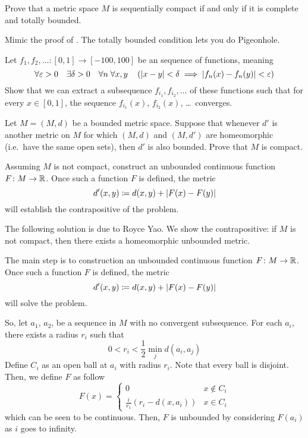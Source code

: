 \begin{dproblem}
	\gim
	Prove that a metric space $M$ is sequentially compact
	if and only if it is complete and totally bounded.
	\label{thm:bzw}
	\begin{hint}
		Mimic the proof of .
		The totally bounded condition lets you do Pigeonhole.
	\end{hint}
\end{dproblem}

\begin{problem}
	\gim
	Let
	$f_1, f_2, \ldots \colon [0,1] \to [-100,100]$
	be an  sequence of functions, meaning
	\[
		\forall \varepsilon > 0 \quad
		\exists \delta > 0 \quad
		\forall n \;
		\forall x,y \quad
		\left( \left\lvert x-y \right\rvert <\delta
		\implies \left\lvert f_n(x) - f_n(y) \right\rvert < \varepsilon \right)
	\]
	Show that we can extract a subsequence $f_{i_1}, f_{i_2}, \dots$
	of these functions such that for every $x \in [0,1]$,
	the sequence $f_{i_1}(x)$, $f_{i_2}(x)$, \dots\ converges.
\end{problem}

\begin{problem}
	\gim
	Let $M = (M,d)$ be a bounded metric space.
	Suppose that whenever $d'$ is another metric on $M$
	for which $(M,d)$ and $(M,d')$ are homeomorphic
	(i.e.\ have the same open sets), then $d'$ is also bounded.
	Prove that $M$ is compact.
	\begin{hint}
		Assuming $M$ is not compact, construct an
		unbounded continuous function $F \colon M \to \mathbb R$.
		Once such a function $F$ is defined, the metric
		\[ d'(x, y) \coloneqq d(x, y) + \left\lvert F(x) - F(y) \right\rvert \]
		will establish the contrapositive of the problem.
	\end{hint}

	\begin{sol}
		The following solution is due to Royce Yao.
		We show the contrapositive:
		if $M$ is not compact, then there exists a homeomorphic unbounded metric.

		The main step is to construction
		an unbounded continuous function $F \colon M \to \mathbb R$.
		Once such a function $F$ is defined, the metric
		\[ d'(x, y) \coloneqq d(x, y) + \left\lvert F(x) - F(y) \right\rvert \]
		will solve the problem.

		So, let $a_1$, $a_2$, \cdots be a sequence in $M$
		with no convergent subsequence.
		For each $a_i$, there exists a radius $r_i$ such that
		\[ 0 < r_i < \frac{1}{2} \min_{j} d(a_i, a_j) \]
		Define $C_i$ as an open ball at $a_i$ with radius $r_i$.
		Note that every ball is disjoint.
		Then, we define $F$ as follow
		\[
			F(x) = \begin{cases}
				0 & x \not\in C_i \\
				\frac{i}{r_1}(r_i - d(x, a_i)) & x \in C_i
			\end{cases}
		\]
		which can be seen to be continuous.
		Then, $F$ is unbounded by considering $F(a_i)$ as $i$ goes to infinity.
	\end{sol}
\end{problem}

